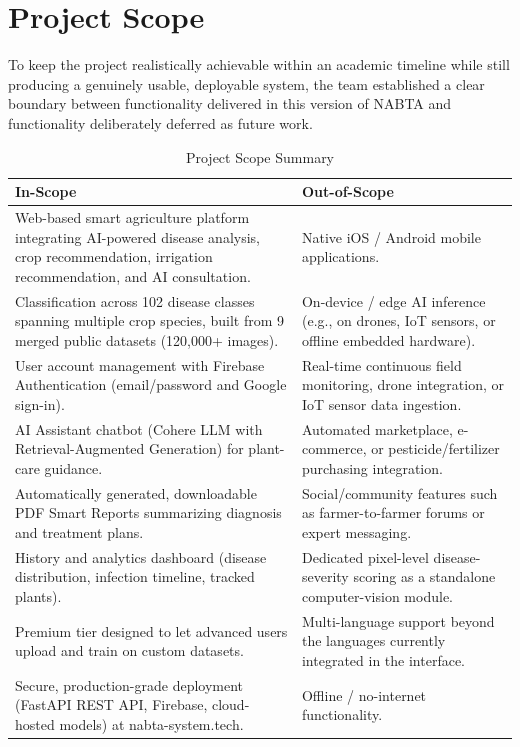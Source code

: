 \section{Project Scope}
\label{sec:intro_scope}

To keep the project realistically achievable within an academic timeline while still producing a genuinely usable, deployable system, the team established a clear boundary between functionality delivered in this version of NABTA and functionality deliberately deferred as future work.

\begin{table}[htbp]
\centering
\caption{Project Scope Summary}
\label{tab:intro_scope}
\begin{tabularx}{\textwidth}{@{}>{\raggedright\arraybackslash}p{}>{\raggedright\arraybackslash}p{}@{}}
\toprule
\textbf{In-Scope} & \textbf{Out-of-Scope} \\
\midrule
Web-based smart agriculture platform integrating AI-powered disease analysis, crop recommendation, irrigation recommendation, and AI consultation. & Native iOS / Android mobile applications. \\
Classification across 102 disease classes spanning multiple crop species, built from 9 merged public datasets (120,000+ images). & On-device / edge AI inference (e.g., on drones, IoT sensors, or offline embedded hardware). \\
User account management with Firebase Authentication (email/password and Google sign-in). & Real-time continuous field monitoring, drone integration, or IoT sensor data ingestion. \\
AI Assistant chatbot (Cohere LLM with Retrieval-Augmented Generation) for plant-care guidance. & Automated marketplace, e-commerce, or pesticide/fertilizer purchasing integration. \\
Automatically generated, downloadable PDF Smart Reports summarizing diagnosis and treatment plans. & Social/community features such as farmer-to-farmer forums or expert messaging. \\
History and analytics dashboard (disease distribution, infection timeline, tracked plants). & Dedicated pixel-level disease-severity scoring as a standalone computer-vision module. \\
Premium tier designed to let advanced users upload and train on custom datasets. & Multi-language support beyond the languages currently integrated in the interface. \\
Secure, production-grade deployment (FastAPI REST API, Firebase, cloud-hosted models) at nabta-system.tech. & Offline / no-internet functionality. \\
\bottomrule
\end{tabularx}
\end{table}

